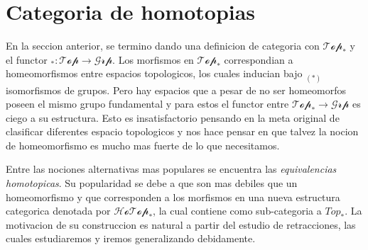 \section{Categoria de homotopias}
En la seccion anterior, se termino dando una definicion de categoria con
\(\mathscr{Top}_*\) y el functor \(_{{*}} : \mathscr{Top} \to
\mathscr{Grp}\). Los morfismos en \(\mathscr{Top}_*\) correspondian a
homeomorfismos entre espacios topologicos, los cuales inducian bajo
\(_{(*)}\) isomorfismos de grupos. Pero hay espacios que a pesar de no
ser homeomorfos poseen el mismo grupo fundamental y para estos el
functor entre \(\mathscr{Top}_* \to \mathscr{Grp}\) es ciego a su
estructura. Esto es insatisfactorio pensando en la meta original de
clasificar diferentes espacio topologicos y nos hace pensar en que
talvez la nocion de homeomorfismo es mucho mas fuerte de lo que
necesitamos.

Entre las nociones alternativas mas populares se encuentra las
\emph{equivalencias homotopicas}. Su popularidad se debe a que son mas
debiles que un homeomorfismo y que corresponden a los morfismos en una
nueva estructura categorica denotada por \(\mathscr{HoTop}_*\), la cual
contiene como sub-categoria a \(Top_*\). La motivacion de su
construccion es natural a partir del estudio de retracciones, las cuales
estudiaremos y iremos generalizando debidamente.

